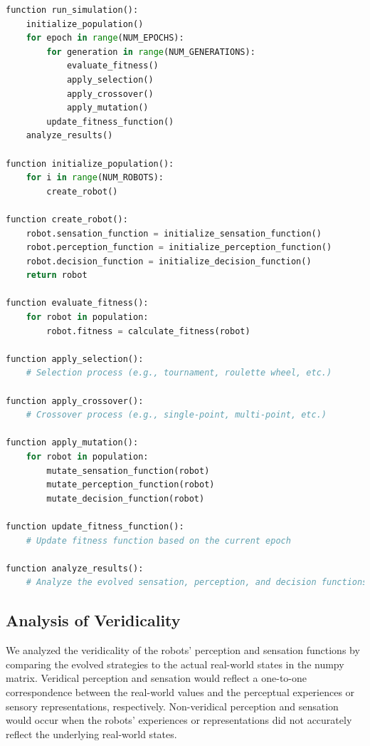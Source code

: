 \documentclass{article}[10pt]
\begin{document}
\begin{lstlisting}[language=Python, caption=Pseudocode of the simulation procedure, label=lst:pseudocode]
function run_simulation():
    initialize_population()
    for epoch in range(NUM_EPOCHS):
        for generation in range(NUM_GENERATIONS):
            evaluate_fitness()
            apply_selection()
            apply_crossover()
            apply_mutation()
        update_fitness_function()
    analyze_results()

function initialize_population():
    for i in range(NUM_ROBOTS):
        create_robot()
        
function create_robot():
    robot.sensation_function = initialize_sensation_function()
    robot.perception_function = initialize_perception_function()
    robot.decision_function = initialize_decision_function()
    return robot

function evaluate_fitness():
    for robot in population:
        robot.fitness = calculate_fitness(robot)

function apply_selection():
    # Selection process (e.g., tournament, roulette wheel, etc.)

function apply_crossover():
    # Crossover process (e.g., single-point, multi-point, etc.)

function apply_mutation():
    for robot in population:
        mutate_sensation_function(robot)
        mutate_perception_function(robot)
        mutate_decision_function(robot)

function update_fitness_function():
    # Update fitness function based on the current epoch

function analyze_results():
    # Analyze the evolved sensation, perception, and decision functions
\end{lstlisting}


\subsection{Analysis of Veridicality}

We analyzed the veridicality of the robots' perception and sensation functions by comparing the evolved strategies to the actual real-world states in the numpy matrix. Veridical perception and sensation would reflect a one-to-one correspondence between the real-world values and the perceptual experiences or sensory representations, respectively. Non-veridical perception and sensation would occur when the robots' experiences or representations did not accurately reflect the underlying real-world states.
\end{document}
